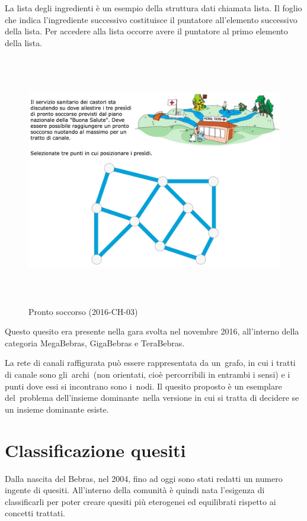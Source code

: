 \documentclass[12pt]{report}
\begin{document}
La lista degli ingredienti è un esempio della struttura dati chiamata lista. Il foglio che indica l'ingrediente successivo costituisce il puntatore all'elemento successivo della lista. Per accedere alla lista occorre avere il puntatore al primo elemento della lista.
%
%
%
\\
\begin{figure}[H]
	\centering
	\includegraphics[height=11.0cm]{2016-CH-03Testo.png}
	\caption{Pronto soccorso (2016-CH-03)}\label{fig:2}
\end{figure}
Questo quesito era presente nella gara svolta nel novembre 2016, all'interno della categoria MegaBebras, GigaBebras e TeraBebras.

La rete di canali raffigurata può essere rappresentata da un grafo, in cui i tratti di canale sono gli archi (non orientati, cioè percorribili in entrambi i sensi) e i punti dove essi si incontrano sono i nodi. Il quesito proposto è un esemplare del problema dell’insieme dominante nella versione in cui si tratta di decidere se un insieme dominante esiste. 

\section{Classificazione quesiti}
Dalla nascita del Bebras, nel 2004, fino ad oggi sono stati redatti un numero ingente di quesiti. All'interno della comunità è quindi nata l'esigenza di classificarli per poter creare quesiti più eterogenei ed equilibrati rispetto ai concetti trattati.
\end{document}
